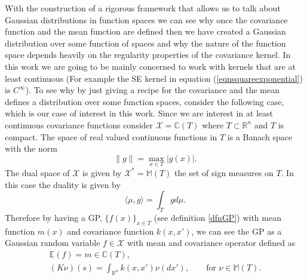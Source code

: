 \documentclass[12pt]{book}
\newcommand{\E}{\mathbb{E}} %
\newcommand{\tvs}{\mathscr{X}} %
\begin{document}
With the construction of a rigorous framework that allows us to talk about Gaussian distributions in 
function spaces we can see why once the covariance function and the mean function are defined then we 
have created a Gaussian distribution over some function of spaces and why the nature of the function
space depends heavily on the regularity properties of the covariance kernel. In 
this work we are going to be mainly concerned to work with kernels that are at least continuous
(For example the SE kernel in equation (\ref{eqnsquareexponential}) is $C^{\infty}$). To see why 
by just giving a recipe for the covariance and the mean defines a distribution over some function
spaces, consider the following case, which is our case of interest in this work. Since we are 
interest in at least continuous covariance functions consider $\tvs=\mathbb{C}(T)$ where 
$T\subset\mathbb{R}^{n}$ and $T$ is compact. The space of real valued continuous functions in $T$ is a Banach
space with the norm \cite{bressan1900lecture}
\begin{equation*}
\|g\|=\max_{x\in T}|g(x)|.
\end{equation*}
The dual space of $\tvs$ is given by $\tvs^{*}=\mathbb{M}(T)$ the set of sign measures on $T$. In this 
case the duality is given by 
\begin{equation*}
\langle\mu,g \rangle=\int_{T}gd\mu.
\end{equation*}
Therefore by having a GP,  $\{f(x)\}_{x\in T}$ (see definition \ref{dfnGP}) with mean function $m(x)$ and 
covariance function $k(x,x')$,  we can see the GP  as a Gaussian random variable $f\in\tvs$ with mean
and covariance operator defined as
\cite{lifshits2012lectures} 
\begin{eqnarray*}
\E(f)=m\in\mathbb{C}(T), \\
(K\nu)(s)=\int_{\mathbb{R}^{n}}k(x,x')\nu(dx'),\qquad\text{for }\nu\in\mathbb{M}(T).
\end{eqnarray*}
\end{document}
